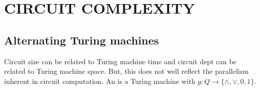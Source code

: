 \section{CIRCUIT COMPLEXITY}
\subsection{Alternating Turing machines}
\bit
\w Circuit size can be related to Turing machine time and circuit dept can be
related to Turing machine space. But, this does not well reflect the
parallelism inherent in circuit computation.
\w An  is a Turing machine with  $g: Q \rightarrow \{\wedge, \vee, 0, 1\}$.
\w 
\eit